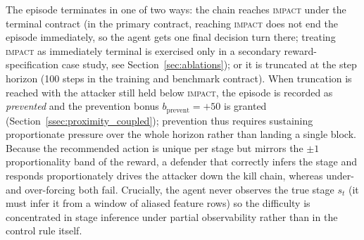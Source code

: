 The episode terminates in one of two ways: the chain reaches \textsc{impact} under the terminal contract (in the primary contract, reaching \textsc{impact} does not end the episode immediately, so the agent gets one final decision turn there; treating \textsc{impact} as immediately terminal is exercised only in a secondary reward-specification case study, see Section~\ref{sec:ablations}); or it is truncated at the step horizon (100 steps in the training and benchmark contract). When truncation is reached with the attacker still held below \textsc{impact}, the episode is recorded as \emph{prevented} and the prevention bonus $b_{\mathrm{prevent}} = +50$ is granted (Section~\ref{ssec:proximity_coupled}); prevention thus requires sustaining proportionate pressure over the whole horizon rather than landing a single block. Because the recommended action is unique per stage but mirrors the $\pm 1$ proportionality band of the reward, a defender that correctly infers the stage and responds proportionately drives the attacker down the kill chain, whereas under- and over-forcing both fail. Crucially, the agent never observes the true stage $s_t$ (it must infer it from a window of aliased feature rows) so the difficulty is concentrated in stage inference under partial observability rather than in the control rule itself.

\clearpage
